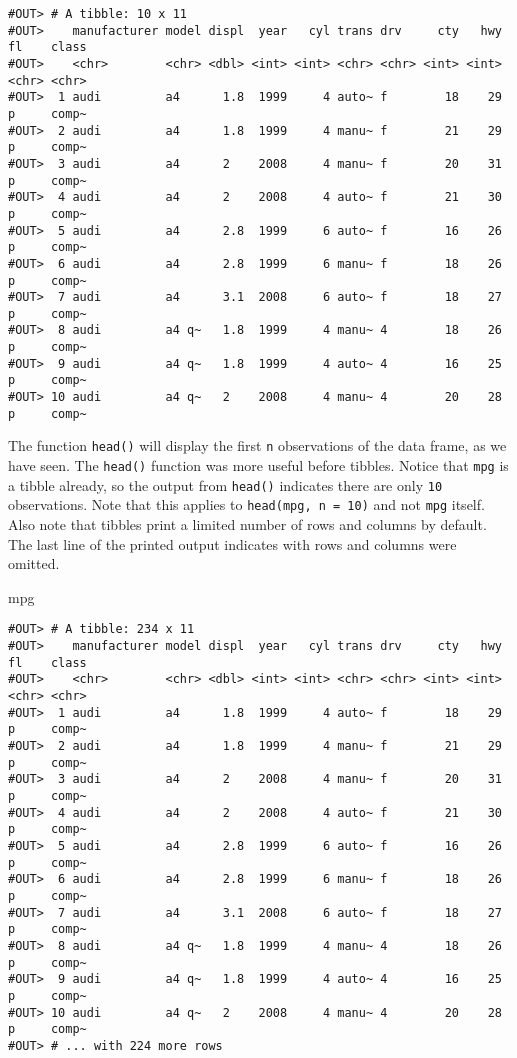 \documentclass[]{book}
\newenvironment{Shaded}{\begin{snugshade}}{\end{snugshade}}
\newcommand{\NormalTok}[1]{#1}
\begin{document}
\begin{verbatim}
#OUT> # A tibble: 10 x 11
#OUT>    manufacturer model displ  year   cyl trans drv     cty   hwy fl    class
#OUT>    <chr>        <chr> <dbl> <int> <int> <chr> <chr> <int> <int> <chr> <chr>
#OUT>  1 audi         a4      1.8  1999     4 auto~ f        18    29 p     comp~
#OUT>  2 audi         a4      1.8  1999     4 manu~ f        21    29 p     comp~
#OUT>  3 audi         a4      2    2008     4 manu~ f        20    31 p     comp~
#OUT>  4 audi         a4      2    2008     4 auto~ f        21    30 p     comp~
#OUT>  5 audi         a4      2.8  1999     6 auto~ f        16    26 p     comp~
#OUT>  6 audi         a4      2.8  1999     6 manu~ f        18    26 p     comp~
#OUT>  7 audi         a4      3.1  2008     6 auto~ f        18    27 p     comp~
#OUT>  8 audi         a4 q~   1.8  1999     4 manu~ 4        18    26 p     comp~
#OUT>  9 audi         a4 q~   1.8  1999     4 auto~ 4        16    25 p     comp~
#OUT> 10 audi         a4 q~   2    2008     4 manu~ 4        20    28 p     comp~
\end{verbatim}

The function \texttt{head()} will display the first \texttt{n}
observations of the data frame, as we have seen. The \texttt{head()}
function was more useful before tibbles. Notice that \texttt{mpg} is a
tibble already, so the output from \texttt{head()} indicates there are
only \texttt{10} observations. Note that this applies to
\texttt{head(mpg,\ n\ =\ 10)} and not \texttt{mpg} itself. Also note
that tibbles print a limited number of rows and columns by default. The
last line of the printed output indicates with rows and columns were
omitted.

\begin{Shaded}
\begin{Highlighting}[]
\NormalTok{mpg}
\end{Highlighting}
\end{Shaded}

\begin{verbatim}
#OUT> # A tibble: 234 x 11
#OUT>    manufacturer model displ  year   cyl trans drv     cty   hwy fl    class
#OUT>    <chr>        <chr> <dbl> <int> <int> <chr> <chr> <int> <int> <chr> <chr>
#OUT>  1 audi         a4      1.8  1999     4 auto~ f        18    29 p     comp~
#OUT>  2 audi         a4      1.8  1999     4 manu~ f        21    29 p     comp~
#OUT>  3 audi         a4      2    2008     4 manu~ f        20    31 p     comp~
#OUT>  4 audi         a4      2    2008     4 auto~ f        21    30 p     comp~
#OUT>  5 audi         a4      2.8  1999     6 auto~ f        16    26 p     comp~
#OUT>  6 audi         a4      2.8  1999     6 manu~ f        18    26 p     comp~
#OUT>  7 audi         a4      3.1  2008     6 auto~ f        18    27 p     comp~
#OUT>  8 audi         a4 q~   1.8  1999     4 manu~ 4        18    26 p     comp~
#OUT>  9 audi         a4 q~   1.8  1999     4 auto~ 4        16    25 p     comp~
#OUT> 10 audi         a4 q~   2    2008     4 manu~ 4        20    28 p     comp~
#OUT> # ... with 224 more rows
\end{verbatim}
\end{document}
